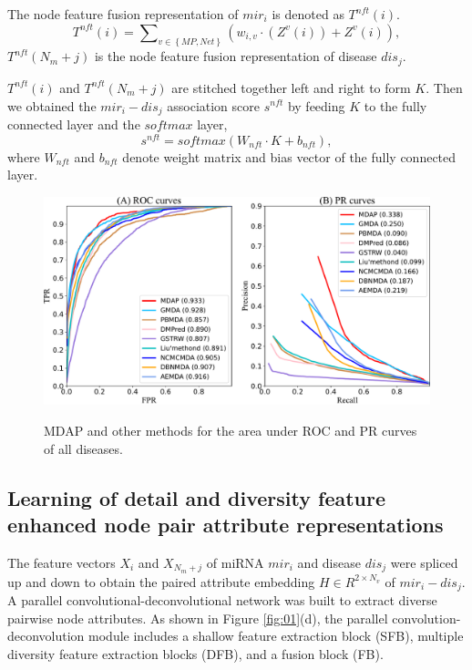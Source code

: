 \documentclass[journal,twoside,web]{ieeecolor}
\begin{document}
The node feature fusion representation of $mi{r_i}$ is denoted as ${T^{nft}}\left( i \right)$.
\begin{equation}
{T^{nft}}\left( i \right) = \sum\nolimits_{v \in \left\{ {MP,Net} \right\}} {\left( {{w_{i,v}}\cdot\left( {{Z^v}\left( i \right)} \right) + {Z^v}\left( i \right)} \right)},
\end{equation}
${T^{nft}}\left( {{N_m} + j} \right)$ is the node feature fusion representation of disease $di{s_j}$.

${T^{nft}}\left( i \right)$ and ${T^{nft}}\left( {{N_m} + j} \right)$ are stitched together left and right to form $K$. Then we obtained the $mi{r_i} - di{s_j}$ association score ${s^{nft}}$ by feeding $K$ to the fully connected layer and the $softmax$ layer,
\begin{equation}
{s^{nft}} = softmax\left( {{W_{nft}} \cdot K + {b_{nft}}} \right),
\end{equation}
where ${W_{nft}}$ and ${b_{nft}}$ denote weight matrix and bias vector of the fully connected layer.

\begin{figure}
	\centering
	\includegraphics[width=6in]{fig/AUC_AUPR.pdf}\\
	\caption{MDAP and other methods for the area under ROC and PR curves of all diseases.}
	\label{fig:04}
	\vspace{-0.4cm}
\end{figure}

\subsection{Learning of detail and diversity feature enhanced node pair attribute representations}

The feature vectors ${X_i}$ and ${X_{{N_m} + j}}$ of miRNA $mi{r_i}$ and disease $di{s_j}$ were spliced up and down to obtain the paired attribute embedding $H \in {R^{2 \times {N_v}}}$ of $mi{r_i} - di{s_j}$. A parallel convolutional-deconvolutional network was built to extract diverse pairwise node attributes. As shown in Figure \ref{fig:01}(d), the parallel convolution-deconvolution module includes a shallow feature extraction block (SFB), multiple diversity feature extraction blocks (DFB), and a fusion block (FB).  
\end{document}
